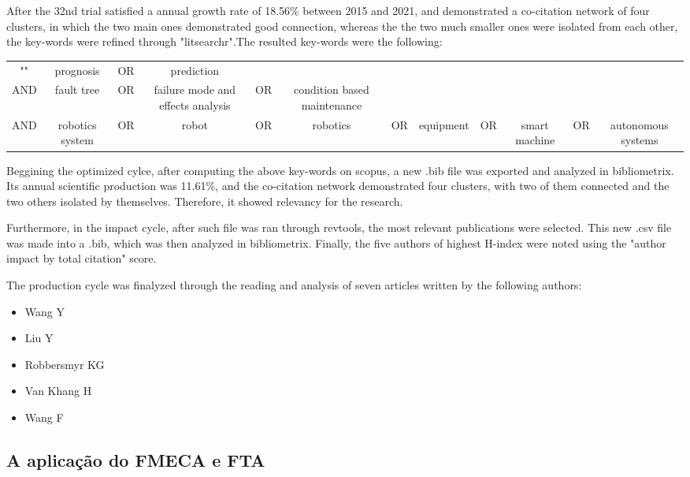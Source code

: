  After the 32nd trial satisfied a annual growth rate of 18.56\% between 2015 and 2021, and demonstrated a co-citation network of four clusters, in which the two main ones demonstrated good connection, whereas the the two much smaller ones were isolated from each other, the key-words were refined through "litsearchr".The resulted key-words were the following:

 \begin{center}
    \begin{tabular}{ c c c c c c c c c c c c }
        "" & prognosis & OR & prediction \\
        AND & fault tree & OR & failure mode and effects analysis & OR & condition based maintenance \\
        AND & robotics system & OR & robot & OR & robotics & OR &equipment & OR & smart machine & OR & autonomous systems
    \end{tabular}
\end{center}

Beggining the optimized cylce, after computing the above key-words on scopus, a new .bib file was exported and analyzed in bibliometrix. Its annual scientific production was 11.61\%, and the co-citation network demonstrated four clusters, with two of them connected and the two others isolated by themselves. Therefore, it showed relevancy for the research.

Furthermore, in the impact cycle, after such file was ran through revtools, the most relevant publications were selected. This new .csv file was made into a .bib, which was then analyzed in bibliometrix. Finally, the five authors of highest H-index were noted using the "author impact by total citation" score. 

The production cycle was finalyzed through the reading and analysis of seven articles written by the following authors:
\begin{itemize}
    \item Wang Y
    \item Liu Y
    \item Robbersmyr KG
    \item Van Khang H
    \item Wang F
\end{itemize}



\subsection{A aplicação do FMECA e FTA}

